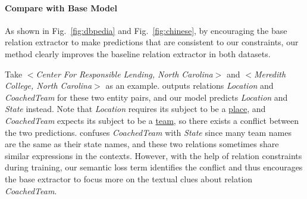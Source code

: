 \paragraph{Compare with Base Model}
As shown in Fig.~\ref{fig:dbpedia} and Fig.~\ref{fig:chinese}, by encouraging the base relation extractor to make predictions that are consistent to our constraints, our \SL method clearly improves the baseline relation extractor in both datasets.

Take $<$\emph{Center For Responsible Lending, North Carolina}$>$ and $<$\emph{Meredith College, North Carolina}$>$ as an example.
\base outputs relations \emph{Location} and \emph{CoachedTeam} for these two entity pairs, and our \SL model predicts \emph{Location} and \emph{State} instead.
Note that \emph{Location} requires its subject to be a \underline{place}, and \emph{CoachedTeam} expects its subject to be a \underline{team}, so there exists a conflict between the two predictions.
\base confuses \emph{CoachedTeam} with \emph{State} since many team names are the same as their state names, and these two relations sometimes share similar expressions in the contexts. 
However, with the help of relation constraints during training, our semantic loss term identifies the conflict and thus encourages the base extractor to focus more on the textual clues about relation \emph{CoachedTeam}.

